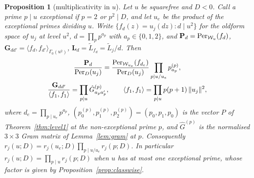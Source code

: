 \documentclass[11pt,a4paper]{article}
\newtheorem{proposition}[theorem]{Proposition}
\theoremstyle{remark}\newtheorem{remark}[theorem]{Remark}
\begin{document}
\begin{proposition}[multiplicativity in $u$]\label{prop:mult}
Let $u$ be squarefree and $D<0$. Call a prime $p\mid u$ \emph{exceptional} if $p=2$ or $p^2\mid D$, and let $u_e$ be the product of
the exceptional primes dividing $u$. Write $\{f_d(z)=u_j(dz):d\mid u^2\}$ for the
oldform space of $u_j$ at level $u^2$, $d=\prod_pp^{a_p}$ with $a_p\in\{0,1,2\}$, and $\mathbf P_d=\mathrm{Per}_{\mathcal W_u}(f_d)$,
$\mathbf G_{dd'}=\langle f_d,f_{d'}\rangle_{\Gamma_0(u^2)}$, $\mathbf L_d=\tilde L_{f_d}=\tilde L_j/d$. Then
\begin{gather*}
\frac{\mathbf P_d}{\mathrm{Per}_D(u_j)}=\frac{\mathrm{Per}_{\mathcal W_{u_e}}(f_{d_e})}{\mathrm{Per}_D(u_j)}\prod_{p\mid u/u_e}p^{(p)}_{a_p},\\
\frac{\mathbf G_{dd'}}{\langle f_1,f_1\rangle}=\prod_{p\mid u}\hat G^{(p)}_{a_pa'_p},\qquad
\langle f_1,f_1\rangle=\prod_{p\mid u}p(p+1)\,\|u_j\|^2,
\end{gather*}
where $d_e=\prod_{p\mid u_e}p^{a_p}$, $(p^{(p)}_0,p^{(p)}_1,p^{(p)}_2)=(p_0,p_1,p_0)$ is the vector $P$ of Theorem~\ref{thm:level1} at the
non-exceptional prime $p$, and $\hat G^{(p)}$ is the normalised $3\times3$ Gram matrix of Lemma~\ref{lem:gram} at $p$. Consequently
$r_j(u;D)=r_j(u_e;D)\prod_{p\mid u/u_e}r_j(p;D)$. In particular $r_j(u;D)=\prod_{p\mid u}r_j(p;D)$ when $u$ has at most one exceptional
prime, whose factor is given by Proposition~\ref{prop:classwise}.
\end{proposition}
\end{document}
